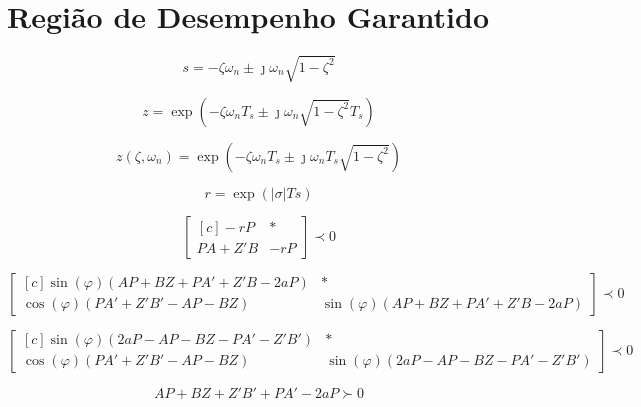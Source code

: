 \chapter{Região de Desempenho Garantido}

\begin{equation}
  s = -\zeta\omega_n \pm \jmath\omega_n \sqrt {1-\zeta^2} \label{eq:PontoPlanoS}
\end{equation}

\begin{equation}
  z = \exp{\left(-\zeta\omega_nT_s \pm \jmath\omega_n\sqrt{1-\zeta^2}T_s\right)}\label{eq:PontoPlanoZ}
\end{equation}

\begin{equation}
  z(\zeta,\omega_n) = \exp{\left(-\zeta\omega_nT_s \pm \jmath\omega_nT_s\sqrt{1-\zeta^2}\right)}\label{eq:FuncaoPontoZ}
\end{equation}

\begin{equation}
  r = \exp{\left(|\sigma|Ts\right)}\label{eq:RaioEstabilidadeRelativa}
\end{equation}

\begin{equation}
  \begin{bmatrix*}[c]
    -rP       & * \\
    PA + Z'B  & -rP
  \end{bmatrix*}
  \prec 0\label{eq:LMIEstabilidadeRelativa}
\end{equation}

\begin{equation}
  \begin{bmatrix*}[c]
    \sin{(\varphi)(AP + BZ + PA' + Z'B -2aP)} & * \\
    \cos{(\varphi)(PA' + Z'B'- AP - BZ)}      &  \sin{(\varphi)(AP + BZ + PA' + Z'B -2aP)}
  \end{bmatrix*}
  \prec 0\label{eq:LMIESetorConicoEsquerdo}
\end{equation}

\begin{equation}
  \begin{bmatrix*}[c]
    \sin{(\varphi)(2aP - AP - BZ - PA' - Z'B')} & * \\
    \cos{(\varphi)(PA' + Z'B' - AP - BZ)}       & \sin{(\varphi)(2aP - AP - BZ - PA' - Z'B')}
  \end{bmatrix*}
  \prec 0\label{eq:LMIESetorConicoDireito}
\end{equation}

\begin{equation}
  AP + BZ + Z'B' + PA' -2aP\label{eq:LMIRightBounded} \succ 0
\end{equation}